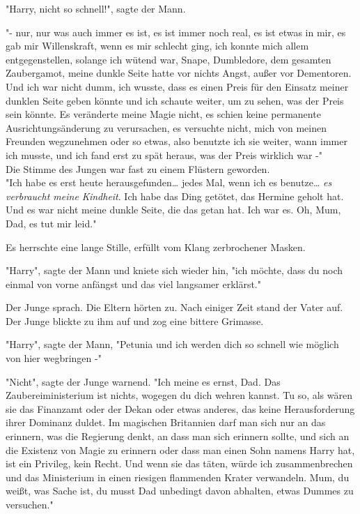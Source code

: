 {"Harry, nicht so schnell!", sagte der Mann.

"- nur, nur was auch immer es ist, es ist immer noch real, es ist etwas in mir, es gab mir Willenskraft, wenn es mir schlecht ging, ich konnte mich allem entgegenstellen, solange ich wütend war, Snape, Dumbledore, dem gesamten Zaubergamot, meine dunkle Seite hatte vor nichts Angst, außer vor Dementoren. Und ich war nicht dumm, ich wusste, dass es einen Preis für den Einsatz meiner dunklen Seite geben könnte und ich schaute weiter, um zu sehen, was der Preis sein könnte. Es veränderte meine Magie nicht, es schien keine permanente Ausrichtungsänderung zu verursachen, es versuchte nicht, mich von meinen Freunden wegzunehmen oder so etwas, also benutzte ich sie weiter, wann immer ich musste, und ich fand erst zu spät heraus, was der Preis wirklich war -"\\ Die Stimme des Jungen war fast zu einem Flüstern geworden.\\ "Ich habe es erst heute herausgefunden… jedes Mal, wenn ich es benutze… \emph{es verbraucht meine Kindheit}. Ich habe das Ding getötet, das Hermine geholt hat. Und es war nicht meine dunkle Seite, die das getan hat. Ich war es. Oh, Mum, Dad, es tut mir leid."

Es herrschte eine lange Stille, erfüllt vom Klang zerbrochener Masken.

"Harry", sagte der Mann und kniete sich wieder hin, "ich möchte, dass du noch einmal von vorne anfängst und das viel langsamer erklärst."

Der Junge sprach. Die Eltern hörten zu. Nach einiger Zeit stand der Vater auf. Der Junge blickte zu ihm auf und zog eine bittere Grimasse.

"Harry", sagte der Mann, "Petunia und ich werden dich so schnell wie möglich von hier wegbringen -"

"Nicht", sagte der Junge warnend. "Ich meine es ernst, Dad. Das Zaubereiministerium ist nichts, wogegen du dich wehren kannst. Tu so, als wären sie das Finanzamt oder der Dekan oder etwas anderes, das keine Herausforderung ihrer Dominanz duldet. Im magischen Britannien darf man sich nur an das erinnern, was die Regierung denkt, an dass man sich erinnern sollte, und sich an die Existenz von Magie zu erinnern oder dass man einen Sohn namens Harry hat, ist ein Privileg, kein Recht. Und wenn sie das täten, würde ich zusammenbrechen und das Ministerium in einen riesigen flammenden Krater verwandeln. Mum, du weißt, was Sache ist, du musst Dad unbedingt davon abhalten, etwas Dummes zu versuchen."

}
